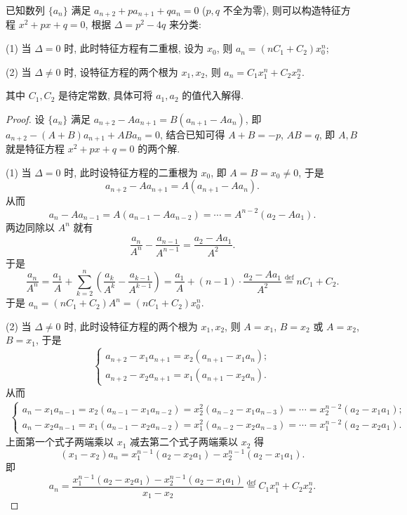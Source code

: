 \documentclass[../../main.tex]{subfiles}
\begin{document}
\begin{proposition}\label{proposition:可直接求通项--类型二}
已知数列 $\{a_n\}$ 满足 $a_{n + 2} + p a_{n + 1} + q a_n = 0$ ($p, q$ 不全为零), 则可以构造特征方程 $x^2 + p x + q = 0$, 根据 $\Delta = p^2 - 4 q$ 来分类:

(1) 当 $\Delta = 0$ 时, 此时特征方程有二重根, 设为 $x_0$, 则 $a_n = (n C_1 + C_2) x_0^n$;

(2) 当 $\Delta \neq 0$ 时, 设特征方程的两个根为 $x_1, x_2$, 则 $a_n = C_1 x_1^n + C_2 x_2^n$.

其中 $C_1, C_2$ 是待定常数, 具体可将 $a_1, a_2$ 的值代入解得.
\end{proposition}
\begin{proof}
设 $\{a_n\}$ 满足 $a_{n + 2} - A a_{n + 1} = B(a_{n + 1} - A a_n)$, 即 $a_{n + 2} - (A + B) a_{n + 1} + A B a_n = 0$, 结合已知可得 $A + B = -p$, $A B = q$, 即 $A, B$ 就是特征方程 $x^2 + p x + q = 0$ 的两个解.

(1) 当 $\Delta = 0$ 时, 此时设特征方程的二重根为 $x_0$, 即 $A = B = x_0 \neq 0$, 于是
\[
a_{n + 2} - A a_{n + 1} = A(a_{n + 1} - A a_n).
\]
从而
\[
a_n - A a_{n - 1} = A(a_{n - 1} - A a_{n - 2}) = \cdots = A^{n - 2}(a_2 - A a_1).
\]
两边同除以 $A^n$ 就有
\[
\frac{a_n}{A^n} - \frac{a_{n - 1}}{A^{n - 1}} = \frac{a_2 - A a_1}{A^2}.
\]
于是
\[
\frac{a_n}{A^n} = \frac{a_1}{A} + \sum_{k = 2}^n \left( \frac{a_k}{A^k} - \frac{a_{k - 1}}{A^{k - 1}} \right) = \frac{a_1}{A} + (n - 1) \cdot \frac{a_2 - A a_1}{A^2} \stackrel{\text{def}}{=} n C_1 + C_2.
\]
于是 $a_n = (n C_1 + C_2) A^n = (n C_1 + C_2) x_0^n$.

(2) 当 $\Delta \neq 0$ 时, 此时设特征方程的两个根为 $x_1, x_2$, 则 $A = x_1$, $B = x_2$ 或 $A = x_2$, $B = x_1$, 于是
\[
\begin{cases} 
a_{n + 2} - x_1 a_{n + 1} = x_2(a_{n + 1} - x_1 a_n); \\
a_{n + 2} - x_2 a_{n + 1} = x_1(a_{n + 1} - x_2 a_n).
\end{cases}
\]
从而
\begin{align*}
\begin{cases}
a_n - x_1 a_{n - 1} = x_2(a_{n - 1} - x_1 a_{n - 2}) = x_2^2(a_{n - 2} - x_1 a_{n - 3}) = \cdots = x_2^{n - 2}(a_2 - x_1 a_1);\\
a_n - x_2 a_{n - 1} = x_1(a_{n - 1} - x_2 a_{n - 2}) = x_1^2(a_{n - 2} - x_2 a_{n - 3}) = \cdots = x_1^{n - 2}(a_2 - x_2 a_1).
\end{cases}
\end{align*}
上面第一个式子两端乘以 $x_1$ 减去第二个式子两端乘以 $x_2$ 得
\[
(x_1 - x_2) a_n = x_1^{n - 1}(a_2 - x_2 a_1) - x_2^{n - 1}(a_2 - x_1 a_1).
\]
即
\[
a_n = \frac{x_1^{n - 1}(a_2 - x_2 a_1) - x_2^{n - 1}(a_2 - x_1 a_1)}{x_1 - x_2} \stackrel{\text{def}}{=} C_1 x_1^n + C_2 x_2^n.
\]
\end{proof}
\end{document}
